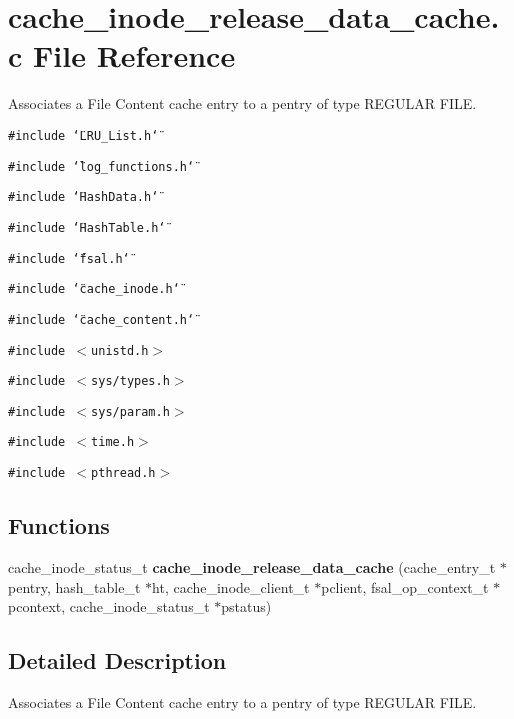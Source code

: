 \section{cache\_\-inode\_\-release\_\-data\_\-cache.c File Reference}
\label{cache__inode__release__data__cache_8c}
Associates a File Content cache entry to a pentry of type REGULAR FILE. 

{\tt \#include \char`\"{}LRU\_\-List.h\char`\"{}}\par
{\tt \#include \char`\"{}log\_\-functions.h\char`\"{}}\par
{\tt \#include \char`\"{}Hash\-Data.h\char`\"{}}\par
{\tt \#include \char`\"{}Hash\-Table.h\char`\"{}}\par
{\tt \#include \char`\"{}fsal.h\char`\"{}}\par
{\tt \#include \char`\"{}cache\_\-inode.h\char`\"{}}\par
{\tt \#include \char`\"{}cache\_\-content.h\char`\"{}}\par
{\tt \#include $<$unistd.h$>$}\par
{\tt \#include $<$sys/types.h$>$}\par
{\tt \#include $<$sys/param.h$>$}\par
{\tt \#include $<$time.h$>$}\par
{\tt \#include $<$pthread.h$>$}\par
\subsection*{Functions}
\begin{CompactItemize}
\item 
cache\_\-inode\_\-status\_\-t {\bf cache\_\-inode\_\-release\_\-data\_\-cache} (cache\_\-entry\_\-t $\ast$pentry, hash\_\-table\_\-t $\ast$ht, cache\_\-inode\_\-client\_\-t $\ast$pclient, fsal\_\-op\_\-context\_\-t $\ast$pcontext, cache\_\-inode\_\-status\_\-t $\ast$pstatus)
\end{CompactItemize}


\subsection{Detailed Description}
Associates a File Content cache entry to a pentry of type REGULAR FILE. 

